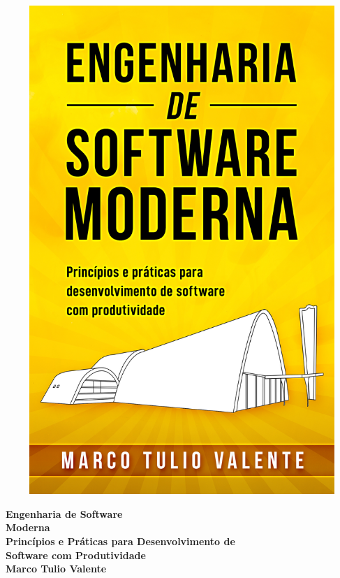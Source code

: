 \thispagestyle{empty}


\begin{titlepage}
\begin{center}
\includegraphics[width=15cm, height=18.5cm]{figs/capa/capa.jpg}
\end{center}
\end{titlepage}

\newpage
\thispagestyle{empty}
\vspace*{4cm}
\begin{center}
{\Huge \bf  Engenharia de Software\\[.3cm] Moderna}\\ 
\vspace*{1cm}
{\Large \bf  Princípios e Práticas para Desenvolvimento de\\[.3cm] Software com Produtividade}\\ 
\vspace*{3cm}
{\Large \bf Marco Tulio Valente}
\end{center}
\newpage

